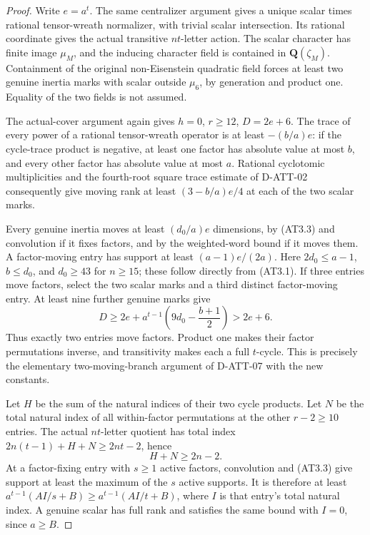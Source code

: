 \begin{proof}
Write $e=a^t$.  The same centralizer argument gives a unique
scalar times rational tensor-wreath normalizer, with trivial
scalar intersection.  Its rational coordinate gives the actual
transitive $nt$-letter action.  The scalar character has finite
image $\mu_M$, and the inducing character field is contained
in $\mathbf Q(\zeta_M)$.  Containment of the original
non-Eisenstein quadratic field forces at least two genuine
inertia marks with scalar outside $\mu_6$, by generation
and product one.  Equality of the two fields is not assumed.

The actual-cover argument again gives $h=0$, $r\ge12$,
$D=2e+6$.  The trace of every power of a rational tensor-wreath
operator is at least $-(b/a)e$: if the cycle-trace product
is negative, at least one factor has absolute value at most
$b$, and every other factor has absolute value at most $a$.
Rational cyclotomic multiplicities and the fourth-root square
trace estimate of D-ATT-02 consequently give moving rank
at least $(3-b/a)e/4$ at each of the two scalar marks.

Every genuine inertia moves at least $(d_0/a)e$ dimensions,
by (AT3.3) and convolution if it fixes factors, and by the
weighted-word bound if it moves them.  A factor-moving entry
has support at least $(a-1)e/(2a)$.  Here
$2d_0\le a-1$, $b\le d_0$, and $d_0\ge43$ for $n\ge15$;
these follow directly from (AT3.1).  If three entries move
factors, select the two scalar marks and a third distinct
factor-moving entry.  At least nine further genuine marks give
\[
 D\ge2e+a^{t-1}\left(9d_0-\frac{b+1}{2}\right)>2e+6.
                                                                  \tag{AT3.12}
\]
Thus exactly two entries move factors.  Product one makes their
factor permutations inverse, and transitivity makes each a full
$t$-cycle.  This is precisely the elementary two-moving-branch
argument of D-ATT-07 with the new constants.

Let $H$ be the sum of the natural indices of their two cycle
products.  Let $N$ be the total natural index of all within-factor
permutations at the other $r-2\ge10$ entries.  The actual
$nt$-letter quotient has total index
$2n(t-1)+H+N\ge2nt-2$, hence
\[
                              H+N\ge2n-2.                \tag{AT3.13}
\]
At a factor-fixing entry with $s\ge1$ active factors, convolution
and (AT3.3) give support at least the maximum of the $s$ active
supports.  It is therefore at least
$a^{t-1}(A I/s+B)\ge a^{t-1}(A I/t+B)$, where $I$ is that
entry's total natural index.  A genuine scalar has full rank
and satisfies the same bound with $I=0$, since $a\ge B$.


\end{proof}
